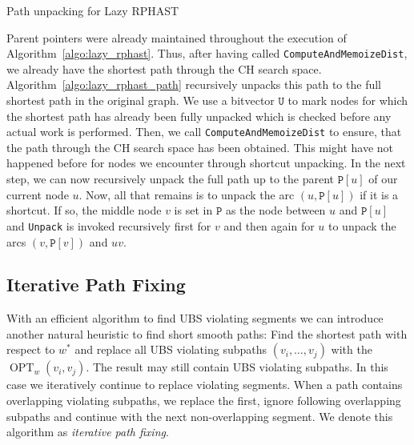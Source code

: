 \documentclass[a4paper,UKenglish,cleveref, autoref, thm-restate]{lipics-v2021}
\newcommand*{\shp}{\operatorname{OPT}}
\begin{document}
\begin{algorithm2e}

\caption{Path unpacking for Lazy RPHAST}
\label{algo:lazy_rphast_path}
\end{algorithm2e}

Parent pointers were already maintained throughout the execution of Algorithm~\ref{algo:lazy_rphast}.
Thus, after having called \texttt{ComputeAndMemoizeDist}, we already have the shortest path through the CH search space.
Algorithm~\ref{algo:lazy_rphast_path} recursively unpacks this path to the full shortest path in the original graph.
We use a bitvector $\mathtt{U}$ to mark nodes for which the shortest path has already been fully unpacked which is checked before any actual work is performed.
Then, we call \texttt{ComputeAndMemoizeDist} to ensure, that the path through the CH search space has been obtained.
This might have not happened before for nodes we encounter through shortcut unpacking.
In the next step, we can now recursively unpack the full path up to the parent $\mathtt{P}[u]$ of our current node $u$.
Now, all that remains is to unpack the arc $(u, \mathtt{P}[u])$ if it is a shortcut.
If so, the middle node $v$ is set in $\mathtt{P}$ as the node between $u$ and $\mathtt{P}[u]$ and \texttt{Unpack} is invoked recursively first for $v$ and then again for $u$ to unpack the arcs $(v, \mathtt{P}[v])$ and $uv$.

\subsection{Iterative Path Fixing}

With an efficient algorithm to find UBS violating segments we can introduce another natural heuristic to find short smooth paths:
Find the shortest path with respect to $w^*$ and replace all UBS violating subpaths $(v_i,\dots,v_j)$ with the $\shp_w(v_i, v_j)$.
The result may still contain UBS violating subpaths.
In this case we iteratively continue to replace violating segments.
When a path contains overlapping violating subpaths, we replace the first, ignore following overlapping subpaths and continue with the next non-overlapping segment.
We denote this algorithm as \emph{iterative path fixing}.
\end{document}
